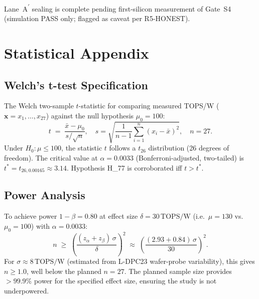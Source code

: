 Lane~A\textsuperscript{$'$} sealing is complete pending first-silicon
measurement of Gate~S4 (simulation PASS only; flagged as caveat per R5-HONEST).


\section{Statistical Appendix}
\label{sec:flos77-stats}

\subsection{Welch's t-test Specification}

The Welch two-sample $t$-statistic for comparing measured TOPS/W
($\mathbf{x} = x_1,\ldots,x_{27}$) against the null hypothesis $\mu_0 = 100$:
%
\begin{equation}
  \label{eq:welch-t}
  t \;=\; \frac{\bar{x} - \mu_0}{s / \sqrt{n}},
  \quad s = \sqrt{\frac{1}{n-1}\sum_{i=1}^{n}(x_i - \bar{x})^2},
  \quad n = 27.
\end{equation}
%
Under $H_0: \mu \leq 100$, the statistic $t$ follows a $t_{26}$ distribution
(26 degrees of freedom).
The critical value at $\alpha = 0.0033$ (Bonferroni-adjusted, two-tailed) is
$t^* = t_{26, 0.00165} \approx 3.14$.
Hypothesis H\_77 is corroborated iff $t > t^*$.

\subsection{Power Analysis}

To achieve power $1 - \beta = 0.80$ at effect size $\delta = 30\,\text{TOPS/W}$
(i.e.\ $\mu = 130$ vs.\ $\mu_0 = 100$) with $\alpha = 0.0033$:
%
\begin{equation}
  \label{eq:power-analysis}
  n \;\geq\; \left(\frac{(z_\alpha + z_\beta)\,\sigma}{\delta}\right)^2
  \;\approx\; \left(\frac{(2.93 + 0.84)\,\sigma}{30}\right)^2.
\end{equation}
%
For $\sigma \approx 8\,\text{TOPS/W}$ (estimated from L-DPC23 wafer-probe
variability), this gives $n \geq 1.0$, well below the planned $n = 27$.
The planned sample size provides $> 99.9\%$ power for the specified effect size,
ensuring the study is not underpowered.

